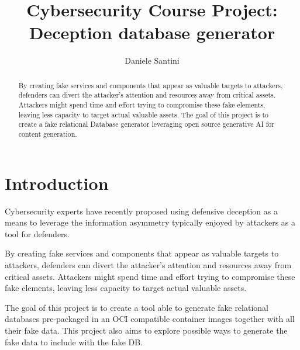 \documentclass[12pt, letterpaper, twoside]{article}
\title{\textbf{Cybersecurity Course Project:\\Deception database generator}} %
\author{Daniele Santini} %
\affiliation{Alma Mater Studiorum - Università di Bologna} %
\begin{document}
\maketitle

\begin{abstract}
    \noindent
    
    By creating fake services and components that appear as valuable targets to attackers, defenders can divert the attacker's attention and resources away from critical assets. Attackers might spend time and effort trying to compromise these fake elements, leaving less capacity to target actual valuable assets. The goal of this project is to create a fake relational Database generator leveraging open source generative AI for content generation.

\end{abstract}

\vspace{2.5cm}


\thispagestyle{firstpage}

\pagebreak


\newgeometry{} %

\section{Introduction}
\label{sec:intro}

Cybersecurity experts have recently proposed using defensive deception as a means to leverage the information asymmetry typically enjoyed by attackers as a tool for defenders.

By creating fake services and components that appear as valuable targets to attackers, defenders can divert the attacker's attention and resources away from critical assets. Attackers might spend time and effort trying to compromise these fake elements, leaving less capacity to target actual valuable assets.

The goal of this project is to create a tool able to generate fake relational databases pre-packaged in an OCI compatible container images together with all their fake data. This project also aims to explore possible ways to generate the fake data to include with the fake DB.
\end{document}

